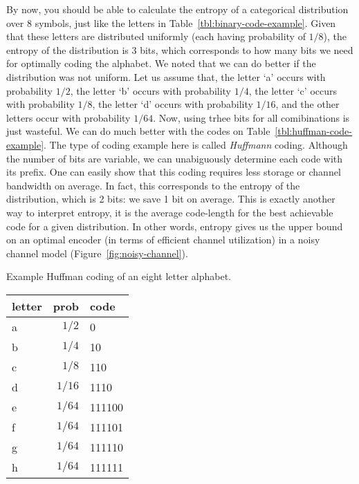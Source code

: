 By now,
you should be able to calculate the entropy of a categorical distribution
over \num{8} symbols,
just like the letters in Table~\ref{tbl:binary-code-example}.
Given that these letters are distributed uniformly
(each having probability of $1/8$),
the entropy of the distribution is \num{3} bits,
which corresponds to how many bits we need for optimally coding the alphabet.
We noted that we can do better if the distribution was not uniform.
Let us assume that,
the letter `a' occurs with probability $1/2$,
the letter `b' occurs with probability $1/4$,
the letter `c' occurs with probability $1/8$,
the letter `d' occurs with probability $1/16$,
and the other letters occur with probability $1/64$.
Now, using trhee bits for all comibinations is just wasteful.
We can do much better with the codes on Table~\ref{tbl:huffman-code-example}.
The type of coding example here is called \emph{Huffmann} coding.
Although the number of bits are variable,
we can unabiguously determine each code with its prefix.
One can easily show that this coding requires less storage or channel bandwidth
on average.
In fact,
this corresponds to the entropy of the distribution,
which is \num{2} bits:
we save \num{1} bit on average.
This is exactly another way to interpret entropy,
it is the average code-length for the best achievable code
for a given distribution.
In other words,
entropy gives us the upper bound on
an optimal encoder (in terms of efficient channel utilization)
in a noisy channel model (Figure~\ref{fig:noisy-channel}).
\begin{margintable}
  \caption{\label{tbl:huffman-code-example}
    Example Huffman coding of an eight letter alphabet.
  }
  \begin{center}
    \begin{tabular}{lrl}
      \toprule
      letter & prob &{code} \\
      \midrule
      a & $1/2$&  \num{0} \\
      b & $1/4$&  \num{10} \\
      c & $1/8$&  \num{110} \\
      d & $1/16$& \num{1110} \\
      e & $1/64$& \num{111100} \\
      f & $1/64$& \num{111101} \\
      g & $1/64$& \num{111110} \\
      h & $1/64$& \num{111111} \\
      \bottomrule
    \end{tabular}
  \end{center}
\end{margintable}


